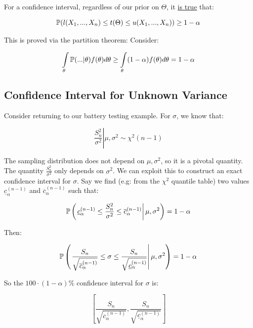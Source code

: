 \documentclass[a4paper]{article}
\begin{document}
            For a confidence interval, regardless of our prior on $\Theta$, it
            \underline{is true} that:

            \[
                \mathbb{P}(l(X_1, ..., X_n) \leq t(\Theta) \leq u(X_1, ..., X_n))
                \geq 1 - \alpha
            \]

            This is proved via the partition theorem: Consider:

            \[
                \int\limits_\theta \mathbb{P}(... | \theta)f(\theta) d \theta \geq
                \int\limits_\theta (1 - \alpha)f(\theta) d \theta = 1 - \alpha
            \]

        \subsection{Confidence Interval for Unknown Variance}
            Consider returning to our battery testing example. For $\sigma$, we
            know that:

            \[
                \left.\frac{S_n^2}{\sigma^2} \right| \mu, \sigma^2 \sim \chi^2(n
                - 1)
            \]

            The sampling distribution does not depend on $\mu, \sigma^2$, so it
            is a pivotal quantity. The quantity $\frac{S_n^2}{\sigma^2}$ only
            depends on $\sigma^2$. We can exploit this to construct an exact
            confidence interval for $\sigma$. Say we find (e.g: from the
            $\chi^2$ quantile table) two values $\underline{c}_\alpha^{(n - 1)}$
            and $\overline{c}_\alpha^{(n - 1)}$ such that:

            \[
                \mathbb{P}\left(\left.\underline{c}_\alpha^{(n-1)} \leq
                \frac{S_n^2}{\sigma^2} \leq \overline{c}_\alpha^{(n-1)}\right|
                \mu, \sigma^2\right) = 1 - \alpha
            \]

            Then:

            \[
                \mathbb{P}\left(\left.\frac{S_n}{\sqrt{\overline{c}_\alpha^{(n-1)}}}
                \leq \sigma \leq \frac{S_n}{\sqrt{\underline{c}_\alpha^{(n-1)}}}
                \right|\mu, \sigma^2\right) = 1 - \alpha
            \]

            So the $100 \cdot (1 - \alpha)$\% confidence interval for $\sigma$
            is:

            \[
                \left[\frac{S_n}{\sqrt{\overline{c}_\alpha^{(n-1)}}},
                \frac{S_n}{\sqrt{\underline{c}_\alpha^{(n-1)}}}\right]
            \]
\end{document}
